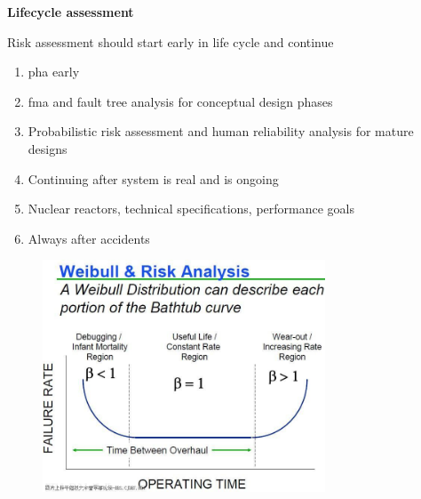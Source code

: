 \documentclass[aspectratio=1610,pdftex,dvipsnames,compress,xcolor={dvipsnames}]{beamer}
\newcommand{\acf}{\acrfull} %
\begin{document}
\begin{frame}[plain]{}
    \centering\LARGE\textbf{Lifecycle assessment}
\end{frame}


\addtocounter{framenumber}{-1}
\begin{frame}{Risk assessment should start early in life cycle and continue}
    \begin{enumerate}[series=outerlist,topsep=0pt,itemsep=15pt,leftmargin=*,label=(\arabic*)]
        \item[]\acf{pha} early
        \item[]\acf{fma} and fault tree analysis for conceptual design phases
        \item[]Probabilistic risk assessment and human reliability analysis for mature designs
        \item[]Continuing after system is real and is ongoing
        \item[]Nuclear reactors, technical specifications, performance goals
        \item[]Always after accidents
    \end{enumerate}
\end{frame}


\begin{frame}{}
    \begin{figure}
        \centering
        \includegraphics[width=0.75\textwidth]{bath.jpg}
    \end{figure}
\end{frame}
\end{document}
